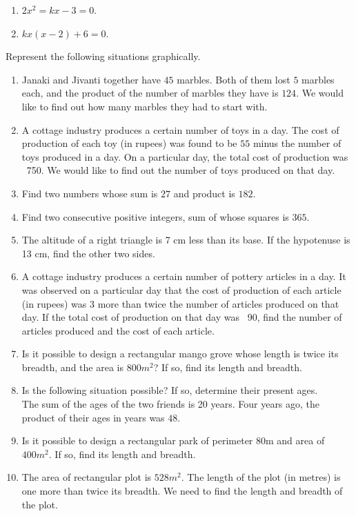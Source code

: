 \begin{enumerate}[label=\thesubsection.\arabic*,ref=\thesubsection.\theenumi,resume*]
\item $2x^2=kx-3=0$.
\item $kx(x-2)+6=0$.
\end{enumerate}
Represent the following situations graphically.
\begin{enumerate}[label=\thesubsection.\arabic*,ref=\thesubsection.\theenumi,resume*]
\item Janaki and Jivanti together have $45$ marbles. Both of them lost $5$ marbles each, and the product of the number of marbles they have is $124$. We would like to find out how many marbles they had to start with.
\item A cottage industry produces a certain number of toys in a day. The cost of production of each toy (in rupees) was found to be $55$ minus the number of toys produced in a day. On a particular day, the total cost of production was \rupee~750. We would like to find out the number of toys produced on that day.
\item Find two numbers whose sum is $27$ and product is $182$.
\item Find two consecutive  positive integers, sum of whose squares is $365$.
\item  The altitude of a right triangle is 7 cm less than its base. If the hypotenuse is 13 cm, find the other two sides.
\item A cottage industry produces a certain number of pottery articles in a day. It was observed on a particular day that the cost of production of each article (in rupees) was $3$ more than twice the number of articles produced on that day. If the total cost of production on that day was \rupee~90, find the number of articles produced and the cost of each article.
\item Is it possible to design a rectangular mango grove whose length is twice its breadth, and the area is  $800m^2$? If so, find its length and breadth.
\item Is the following situation possible? If so, determine their present ages.
\\ The sum of the ages of the two friends is 20 years. Four years ago, the product of their ages in years was $48$.
\item Is it possible to design a rectangular park of perimeter 80m and area of $400m^2$. If so, find its length and breadth.
\item The area of rectangular plot is $528m^2$. The length of the plot (in metres) is one more than twice its breadth. We need to find the length and breadth of the plot.

\end{enumerate}
